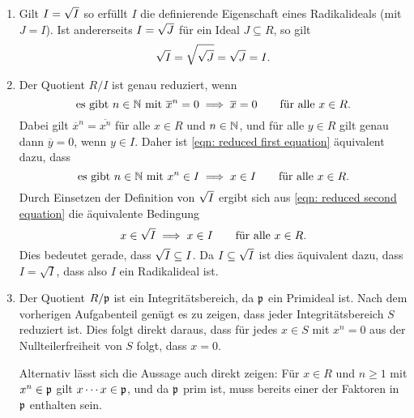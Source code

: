 \begin{solution}
\begin{enumerate}
    \item
      Gilt $I = \sqrt{I}$ so erfüllt $I$ die definierende Eigenschaft eines Radikalideals (mit $J = I$).
      Ist andererseits $I = \sqrt{J}$ für ein Ideal $J \subseteq R$, so gilt
      \[
          \sqrt{I}
        = \sqrt{\sqrt{J}}
        = \sqrt{J}
        = I.
      \]

    \item
      Der Quotient $R/I$ ist genau reduziert, wenn
      \begin{equation}
        \label{eqn: reduced first equation}
        \text{es gibt $n \in \mathbb{N}$ mit $\overline{x}^n = 0$}
        \implies
        \overline{x} = 0
        \qquad
        \text{für alle $x \in R$}.
      \end{equation}
      Dabei gilt $\overline{x}^n = \overline{x^n}$ für alle $x \in R$ und $n \in \mathbb{N}$, und für alle $y \in R$ gilt genau dann $\overline{y} = 0$, wenn $y \in I$.
      Daher ist \eqref{eqn: reduced first equation} äquivalent dazu, dass
      \begin{equation}
        \label{eqn: reduced second equation}
        \text{es gibt $n \in \mathbb{N}$ mit $x^n \in I$}
        \implies
        x \in I
        \qquad
        \text{für alle $x \in R$}.
      \end{equation}
      Durch Einsetzen der Definition von $\sqrt{I}$ ergibt sich aus \eqref{eqn: reduced second equation} die äquivalente Bedingung
      \[
        x \in \sqrt{I}
        \implies
        x \in I
        \qquad
        \text{für alle $x \in R$}.
      \]
      Dies bedeutet gerade, dass $\sqrt{I} \subseteq I$.
      Da $I \subseteq \sqrt{I}$ ist dies äquivalent dazu, dass $I = \sqrt{I}$, dass also $I$ ein Radikalideal ist.
      
    \item
      Der Quotient $R/\mathfrak{p}$ ist ein Integritätsbereich, da $\mathfrak{p}$ ein Primideal ist.
      Nach dem vorherigen Aufgabenteil genügt es zu zeigen, dass jeder Integritätsbereich $S$ reduziert ist.
      Dies folgt direkt daraus, dass für jedes $x \in S$ mit $x^n = 0$ aus der Nullteilerfreiheit von $S$ folgt, dass $x = 0$.
      
      Alternativ lässt sich die Aussage auch direkt zeigen:
      Für $x \in R$ und $n \geq 1$ mit $x^n \in \mathfrak{p}$ gilt $x \dotsm x \in \mathfrak{p}$, und da $\mathfrak{p}$ prim ist, muss bereits einer der Faktoren in $\mathfrak{p}$ enthalten sein.
  \end{enumerate}
\end{solution}



